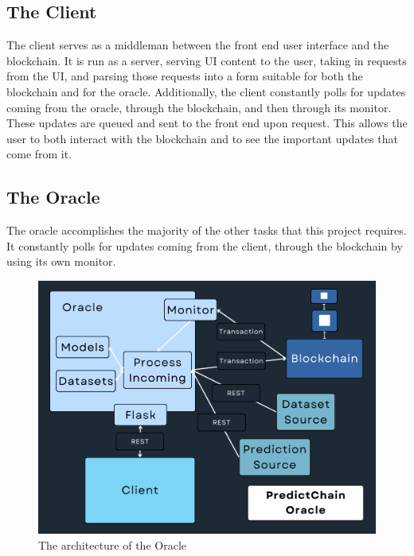 \documentclass{ledger}
\begin{document}
\subsection{The Client}

The client serves as a middleman between the front end user interface and the blockchain.  It is run as a server,
serving UI content to the user, taking in requests from the UI, and parsing those requests into a form suitable for
both the blockchain and for the oracle.  Additionally, the client constantly polls for updates coming from the oracle,
through the blockchain, and then through its monitor.  These updates are queued and sent to the front end upon request.
This allows the user to both interact with the blockchain and to see the important updates that come from it.

\subsection{The Oracle}

The oracle accomplishes the majority of the other tasks that this project requires.  It constantly polls for updates
coming from the client, through the blockchain by using its own monitor.

\begin{figure}[H]
    \begin{center}
        \begin{minipage}{0.6\textwidth}
        \centering
        \includegraphics[width=\linewidth]{images/oracleDiagram}
        \caption{The architecture of the Oracle}\label{Fig:oracleDiagram}
    \end{minipage}\hfill
    \end{center}
\end{figure}
\end{document}
